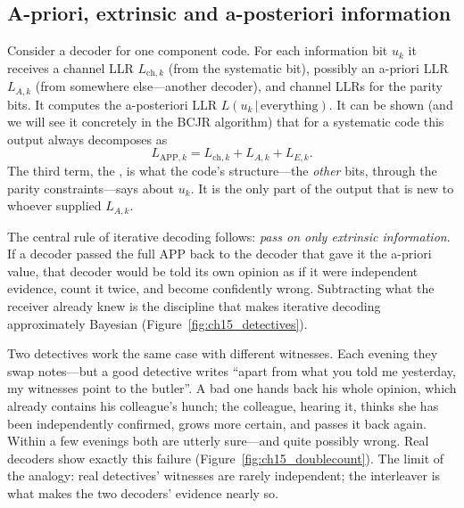 \subsection{A-priori, extrinsic and a-posteriori information}

Consider a decoder for one component code. For each information bit $u_k$ it receives a channel
LLR $L_{\text{ch},k}$ (from the systematic bit), possibly an a-priori LLR $L_{A,k}$ (from somewhere
else---another decoder), and channel LLRs for the parity bits. It computes the a-posteriori LLR
$L(u_k\,|\,\text{everything})$. It can be shown (and we will see it concretely in the BCJR
algorithm) that for a systematic code this output always decomposes as
\begin{equation}
L_{\text{APP},k}=L_{\text{ch},k}+L_{A,k}+L_{E,k}.
\label{eq:ch15:extrinsic}
\end{equation}
The third term, the , is what the code's structure---the \emph{other}
bits, through the parity constraints---says about $u_k$. It is the only part of the output that
is new to whoever supplied $L_{A,k}$.

The central rule of iterative decoding follows: \emph{pass on only extrinsic information}. If a
decoder passed the full APP back to the decoder that gave it the a-priori value, that decoder
would be told its own opinion as if it were independent evidence, count it twice, and become
confidently wrong. Subtracting what the receiver already knew is the discipline that makes
iterative decoding approximately Bayesian (Figure~\ref{fig:ch15_detectives}).

\begin{analogy}
Two detectives work the same case with different witnesses. Each evening they swap notes---but a
good detective writes ``apart from what you told me yesterday, my witnesses point to the
butler''. A bad one hands back his whole opinion, which already contains his colleague's hunch;
the colleague, hearing it, thinks she has been independently confirmed, grows more certain, and
passes it back again. Within a few evenings both are utterly sure---and quite possibly wrong.
Real decoders show exactly this failure (Figure~\ref{fig:ch15_doublecount}). The limit of the
analogy: real detectives' witnesses are rarely independent; the interleaver is what makes the two
decoders' evidence nearly so.
\end{analogy}

